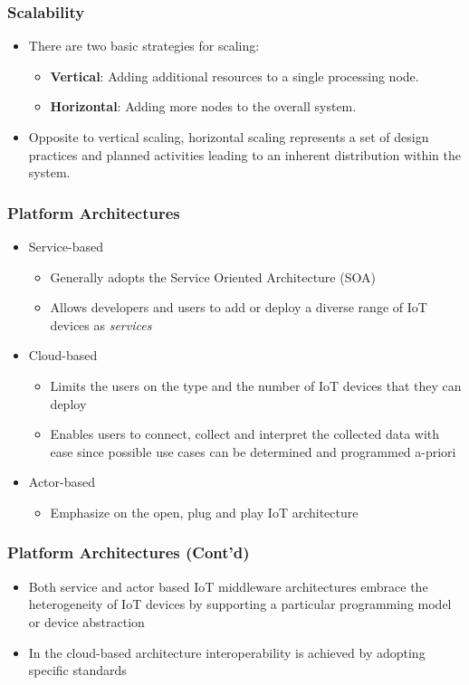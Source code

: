 \documentclass{../iot-lecture}
\begin{document}
\begin{frame}
  \frametitle{Scalability}
  \begin{itemize}
    \item There are two basic strategies for scaling:
    \begin{itemize}
      \item \textbf{\color{RubineRed} Vertical}: Adding additional resources to a single processing node.
      \item \textbf{\color{Cyan} Horizontal}: Adding more nodes to the overall system.
    \end{itemize}
    \item Opposite to vertical scaling, horizontal scaling represents a set of design practices and
      planned activities leading to an inherent distribution within the system.
  \end{itemize}
\end{frame}

\begin{frame}
  \frametitle{Platform Architectures}
  \begin{itemize}
    \item Service-based
    \begin{itemize}
      \item Generally adopts the Service Oriented Architecture (SOA)
      \item Allows developers and users to add or deploy a diverse range of IoT devices as
        \textit{\color{YellowOrange} services}
    \end{itemize}
    \item Cloud-based
    \begin{itemize}
      \item Limits the users on the type and the number of IoT devices that they can deploy
      \item Enables users to connect, collect and interpret the collected data with ease
        since possible use cases can be determined and programmed a-priori
    \end{itemize}
    \item Actor-based
    \begin{itemize}
      \item Emphasize on the open, plug and play IoT architecture
    \end{itemize}
  \end{itemize}
\end{frame}

\begin{frame}
  \frametitle{Platform Architectures (Cont'd)}
  \begin{itemize}
    \item Both service and actor based IoT middleware architectures embrace the heterogeneity
      of IoT devices by supporting a particular programming model or device abstraction
    \item In the cloud-based architecture interoperability is achieved by adopting specific standards
  \end{itemize}
\end{frame}
\end{document}
